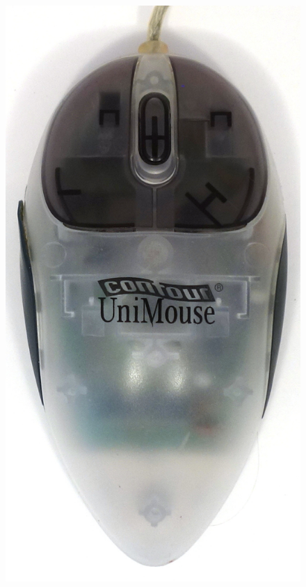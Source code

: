 \documentclass[11pt, a4paper]{article}
\begin{document}
\begin{figure}[h]
    \centering
    \includegraphics[scale=0.45]{1999_contour_unimouse/top_30.jpg}

\end{figure}
\end{document}
